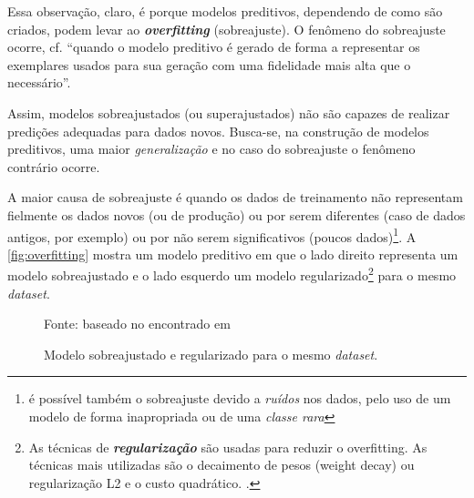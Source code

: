Essa observação, claro, é porque modelos preditivos, dependendo de como são criados, podem levar ao \textit{\textbf{overfitting}} (sobreajuste). O fenômeno do sobreajuste ocorre, cf.  ``quando o modelo preditivo é gerado de forma a representar os exemplares usados para sua geração com uma fidelidade mais alta que o necessário''. 

Assim, modelos sobreajustados (ou superajustados) não são capazes de realizar predições adequadas para dados novos. Busca-se, na construção de modelos preditivos, uma maior \textit{generalização} e no caso do sobreajuste o fenômeno contrário ocorre. 

A maior causa de sobreajuste é quando os dados de treinamento não representam fielmente os dados novos (ou de produção) ou por serem diferentes (caso de dados antigos, por exemplo) ou por não serem significativos (poucos dados)\footnote{ é possível também o sobreajuste devido a \textit{ruídos} nos dados, pelo uso de um modelo de forma inapropriada ou de uma \textit{classe rara} }. A \autoref{fig:overfitting} mostra um modelo preditivo em que o lado direito representa um modelo sobreajustado e o lado esquerdo um modelo regularizado\footnote{As técnicas de \textbf{\textit{regularização}} são usadas para reduzir o overfitting. As técnicas mais utilizadas são o decaimento de pesos (weight decay) ou regularização L2 e o custo quadrático. \cite{deep_learning_book_2019}.} para o mesmo \textit{dataset}.

\begin{figure}[h!]
	\centering
	\caption{Modelo sobreajustado e regularizado para o mesmo \textit{dataset}.}
	
	{\scriptsize Fonte: baseado no encontrado em }
	\label{fig:overfitting}
\end{figure}

